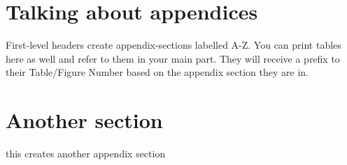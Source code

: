 \documentclass[
  man]{apa7}
\begin{document}
\hypertarget{appendix-appendix}{%
\appendix}


\hypertarget{talking-about-appendices}{%
\section{Talking about appendices}\label{talking-about-appendices}}

First-level headers create appendix-sections labelled A-Z. You can print tables here as well and refer to them in your main part. They will receive a prefix to their Table/Figure Number based on the appendix section they are in.

\hypertarget{another-section}{%
\section{Another section}\label{another-section}}

this creates another appendix section
\end{document}
